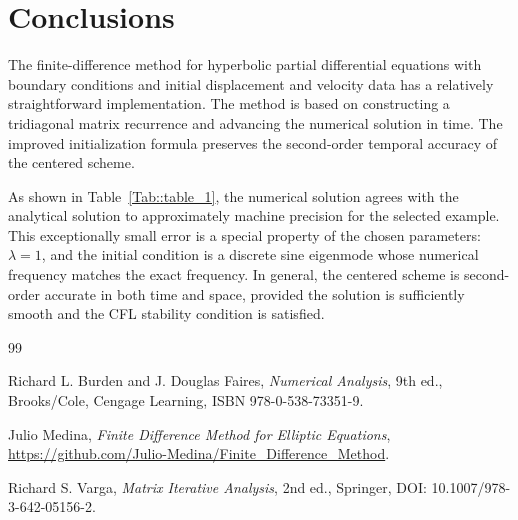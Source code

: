 \documentclass[a4paper]{article}
\begin{document}
\section{Conclusions}

The finite-difference method for hyperbolic partial differential equations with boundary conditions and initial displacement and velocity data has a relatively straightforward implementation. The method is based on constructing a tridiagonal matrix recurrence and advancing the numerical solution in time. The improved initialization formula preserves the second-order temporal accuracy of the centered scheme.

As shown in Table~\ref{Tab::table_1}, the numerical solution agrees with the analytical solution to approximately machine precision for the selected example. This exceptionally small error is a special property of the chosen parameters: $\lambda=1$, and the initial condition is a discrete sine eigenmode whose numerical frequency matches the exact frequency. In general, the centered scheme is second-order accurate in both time and space, provided the solution is sufficiently smooth and the CFL stability condition is satisfied.

\begin{thebibliography}{99}

 Richard L. Burden and J. Douglas Faires, \textit{Numerical Analysis}, 9th ed., Brooks/Cole, Cengage Learning, ISBN 978-0-538-73351-9.

 Julio Medina, \textit{Finite Difference Method for Elliptic Equations}, \url{https://github.com/Julio-Medina/Finite_Difference_Method}.

 Richard S. Varga, \textit{Matrix Iterative Analysis}, 2nd ed., Springer, DOI: 10.1007/978-3-642-05156-2.

\end{thebibliography}
\end{document}
